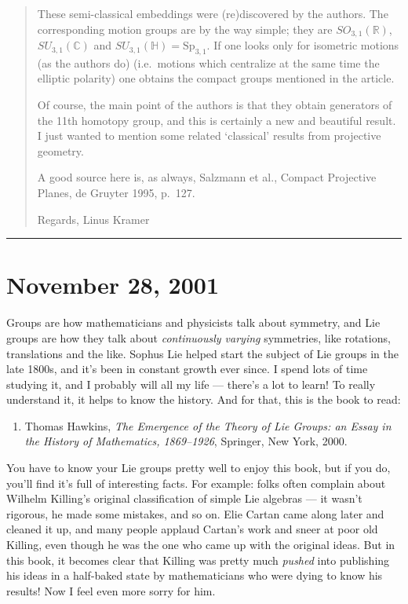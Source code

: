 \documentclass{article}
\def\tightlist{}
\begin{document}
\begin{quote}
These semi-classical embeddings were (re)discovered by the authors. The
corresponding motion groups are by the way simple; they are
\(SO_{3,1}(\mathbb{R})\), \(SU_{3,1}(\mathbb{C})\) and
\(SU_{3,1}(\mathbb{H})=\mathrm{Sp}_{3,1}\). If one looks only for
isometric motions (as the authors do) (i.e.~motions which centralize at
the same time the elliptic polarity) one obtains the compact groups
mentioned in the article.

Of course, the main point of the authors is that they obtain generators
of the 11th homotopy group, and this is certainly a new and beautiful
result. I just wanted to mention some related `classical' results from
projective geometry.

A good source here is, as always, Salzmann et al., Compact Projective
Planes, de Gruyter 1995, p.~127.

Regards, Linus Kramer
\end{quote}

\begin{center}\rule{0.5\linewidth}{0.5pt}\end{center}



\hypertarget{week174}{%
\section{November 28, 2001}\label{week174}}

Groups are how mathematicians and physicists talk about symmetry, and
Lie groups are how they talk about \emph{continuously varying}
symmetries, like rotations, translations and the like. Sophus Lie helped
start the subject of Lie groups in the late 1800s, and it's been in
constant growth ever since. I spend lots of time studying it, and I
probably will all my life --- there's a lot to learn! To really
understand it, it helps to know the history. And for that, this is the
book to read:

\begin{enumerate}
\def\labelenumi{\arabic{enumi})}
\tightlist
\item
  Thomas Hawkins, \emph{The Emergence of the Theory of Lie Groups: an
  Essay in the History of Mathematics, 1869--1926}, Springer, New York,
  2000.
\end{enumerate}

You have to know your Lie groups pretty well to enjoy this book, but if
you do, you'll find it's full of interesting facts. For example: folks
often complain about Wilhelm Killing's original classification of simple
Lie algebras --- it wasn't rigorous, he made some mistakes, and so on.
Elie Cartan came along later and cleaned it up, and many people applaud
Cartan's work and sneer at poor old Killing, even though he was the one
who came up with the original ideas. But in this book, it becomes clear
that Killing was pretty much \emph{pushed} into publishing his ideas in
a half-baked state by mathematicians who were dying to know his results!
Now I feel even more sorry for him.
\end{document}
